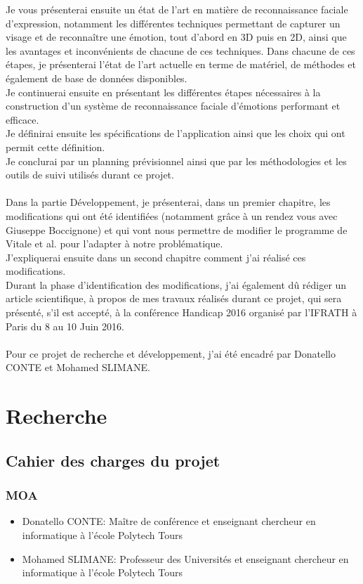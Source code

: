 \documentclass[poster]{polytech/polytech}
\begin{document}
Je vous présenterai ensuite un état de l'art en matière de reconnaissance faciale d'expression, notamment les différentes techniques permettant de capturer un visage et de reconnaître une émotion, tout d'abord en 3D puis en 2D, ainsi que les avantages et inconvénients de chacune de ces techniques. Dans chacune de ces étapes, je présenterai l'état de l'art actuelle en terme de matériel, de méthodes et également de base de données disponibles. \\
Je continuerai ensuite en présentant les différentes étapes nécessaires à la construction d'un système de reconnaissance faciale d'émotions performant et efficace.\\
Je définirai ensuite les spécifications de l'application ainsi que les choix qui ont permit cette définition.\\
Je conclurai par un planning prévisionnel ainsi que par les méthodologies et les outils de suivi utilisés durant ce projet.\\
\\
Dans la partie Développement, je présenterai, dans un premier chapitre, les modifications qui ont été identifiées (notamment grâce à un rendez vous avec Giuseppe Boccignone) et qui vont nous permettre de modifier le programme de Vitale et al. pour l'adapter à notre problématique.\\
J'expliquerai ensuite dans un second chapitre comment j'ai réalisé ces modifications.\\
Durant la phase d'identification des modifications, j'ai également dû rédiger un article scientifique, à propos de mes travaux réalisés durant ce projet, qui sera présenté, s'il est accepté, à la conférence Handicap 2016 organisé par l'IFRATH à Paris du 8 au 10 Juin 2016.\\
\\
Pour ce projet de recherche et développement, j'ai été encadré par Donatello CONTE et Mohamed SLIMANE.


\part{Recherche}
\label{part:part_recherche}

\chapter{Cahier des charges du projet}
\label{chap:chap_cdc}

\section{MOA}
\begin{itemize}
\item Donatello CONTE: Maître de conférence et enseignant chercheur en informatique à l'école Polytech Tours
\item Mohamed SLIMANE: Professeur des Universités et enseignant chercheur en informatique à l'école Polytech Tours
\end{itemize}
\end{document}
